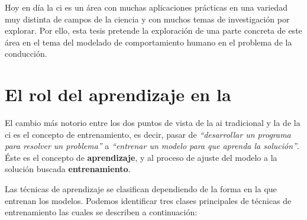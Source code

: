 
Hoy en día la \gls{ci} es un área con muchas aplicaciones prácticas en una variedad muy distinta de campos de la ciencia y con muchos temas de investigación por explorar. Por ello, esta tesis pretende la exploración de una parte concreta de este área en el tema del modelado de comportamiento humano en el problema de la conducción.

\section{El rol del aprendizaje en la }
\label{s:the-learning-role}

El cambio más notorio entre los dos puntos de vista de la \gls{ai} tradicional y la de la \gls{ci} es el concepto de entrenamiento, es decir, pasar de \textit{\enquote{desarrollar un programa para resolver un problema}} a \textit{\enquote{entrenar un modelo para que aprenda la solución}}. Éste es el concepto de \textbf{aprendizaje}, y al proceso de ajuste del modelo a la solución buscada \textbf{entrenamiento}.

Las técnicas de aprendizaje se clasifican dependiendo de la forma en la que entrenan los modelos. Podemos identificar tres clases principales de técnicas de entrenamiento las cuales se describen a continuación:

